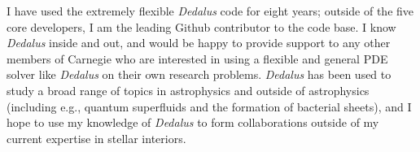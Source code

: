 \documentclass[12pt]{article}
\begin{document}
I have used the extremely flexible \emph{Dedalus} code for eight years; outside of the five core developers, I am the leading Github contributor to the code base.
I know \emph{Dedalus} inside and out, and would be happy to provide support to any other members of Carnegie who are interested in using a flexible and general PDE solver like \emph{Dedalus} on their own research problems.
\emph{Dedalus} has been used to study a broad range of topics in astrophysics and outside of astrophysics (including e.g., quantum superfluids and the formation of bacterial sheets), and I hope to use my knowledge of \emph{Dedalus} to form collaborations outside of my current expertise in stellar interiors.

{\small%

}
\end{document}
